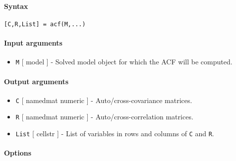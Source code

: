 


	\paragraph{Syntax}

\begin{verbatim}
[C,R,List] = acf(M,...)
\end{verbatim}

\paragraph{Input arguments}

\begin{itemize}
\itemsep1pt\parskip0pt
\item
  \texttt{M} {[} model {]} - Solved model object for which the ACF will
  be computed.
\end{itemize}

\paragraph{Output arguments}

\begin{itemize}
\item
  \texttt{C} {[} namedmat \textbar{} numeric {]} - Auto/cross-covariance
  matrices.
\item
  \texttt{R} {[} namedmat \textbar{} numeric {]} -
  Auto/cross-correlation matrices.
\item
  \texttt{List} {[} cellstr {]} - List of variables in rows and columns
  of \texttt{C} and \texttt{R}.
\end{itemize}

\paragraph{Options}

